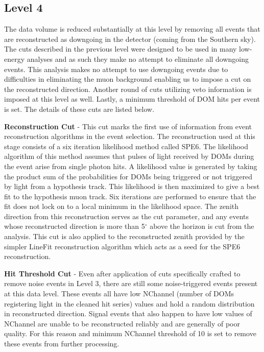 \documentclass{gatech-thesis}
\begin{document}
\subsection{Level 4}
The data volume is reduced substantially at this level by removing all events that are reconstructed as downgoing  in the detector (coming from the Southern sky). The cuts described in the previous level were designed to be used in many low-energy analyses and as such they make no attempt to eliminate all downgoing events. This analysis makes no attempt to use downgoing events due to difficulties in eliminating the muon background enabling us to impose a cut on the reconstructed direction. Another round of cuts utilizing veto information is imposed at this level as well. Lastly, a minimum threshold of DOM hits per event is set. The details of these cuts are listed below.
\begin{adjustwidth}{2.5em}{2.5em}
\setlength{\parindent}{0pt}
\textbf{Reconstruction Cut} - This cut marks the first use of information from event reconstruction algorithms in the event selection. The reconstruction used at this stage consists of a six iteration likelihood method called SPE6. The likelihood algorithm of this method assumes that pulses of light received by DOMs during the event arise from single photon hits. A likelihood value is generated by taking the product sum of the probabilities for DOMs being triggered or not triggered by light from a hypothesis track. This likelihood is then maximized to give a best fit to the hypothesis muon track. Six iterations are performed to ensure that the fit does not lock on to a local minimum in the likelihood space. The zenith direction from this reconstruction serves as the cut parameter, and any events whose reconstructed direction is more than 5$^{\circ}$ above the horizon is cut from the analysis. This cut is also applied to the reconstructed zenith provided by the simpler LineFit reconstruction algorithm which acts as a seed for the SPE6 reconstruction.

\textbf{Hit Threshold Cut} - Even after application of cuts specifically crafted to remove noise events in Level 3, there are still some noise-triggered events present at this data level. These events all have low NChannel (number of DOMs registering light in the cleaned hit series) values and hold a random distribution in reconstructed direction. Signal events that also happen to have low values of NChannel are unable to be reconstructed reliably and are generally of poor quality. For this reason and minimum NChannel threshold of 10 is set to remove these events from further processing.


\end{adjustwidth}
\end{document}

